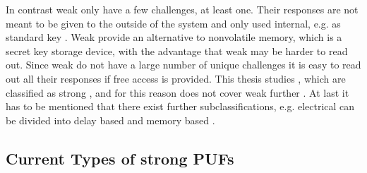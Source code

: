 In contrast weak \pufs only have a few challenges, at least one.
Their responses are not meant to be given to the outside of the system and only used internal, e.g. as standard key \cite{Ruhrmair2012AnPUFs}.
Weak \pufs provide an alternative to nonvolatile memory, which is a secret key storage device, with the advantage that weak \pufs may be harder to read out. %
Since weak \pufs do not have a large number of unique challenges it is easy to read out all their responses if free access is provided.
This thesis studies \apufs, which are classified as strong \puf, and for this reason does not cover weak \pufs further \cite{Ruhrmair2010StrongProofs}.
At last it has to be mentioned that there exist further subclassifications, e.g. electrical \pufs can be divided into delay based \pufs and memory based \pufs. %


\subsection{Current Types of strong PUFs}
\label{sec:typesofpufs}

